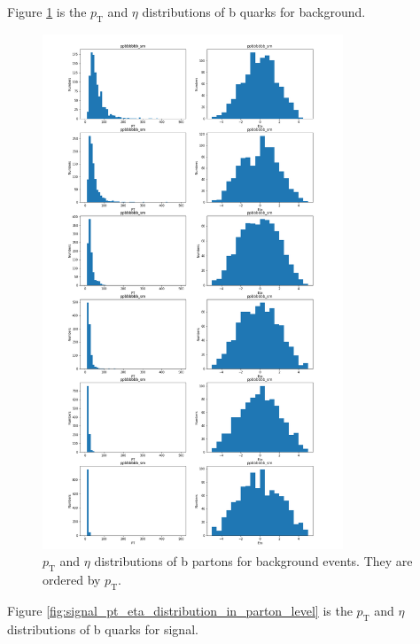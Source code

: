 \documentclass[12pt]{article}
\begin{document}
	Figure \ref{fig:background_pt_eta_distribution_in_parton_level} is the  $p_\text{T}$ and  $\eta$ distributions of b quarks for background.	
	\begin{figure}[htpb]
		\centering
		\includegraphics[width=0.8\textwidth]{ppbbbbbb_sm_PT_Eta_order_by_PT.png}
		\caption{$p_\text{T}$ and $\eta$ distributions of b partons for background events. They are ordered by $p_\text{T}$.}
		\label{fig:background_pt_eta_distribution_in_parton_level}
	\end{figure}

	Figure \ref{fig:signal_pt_eta_distribution_in_parton_level} is the $p_\text{T}$ and $\eta$ distributions of b quarks for signal.
\end{document}
